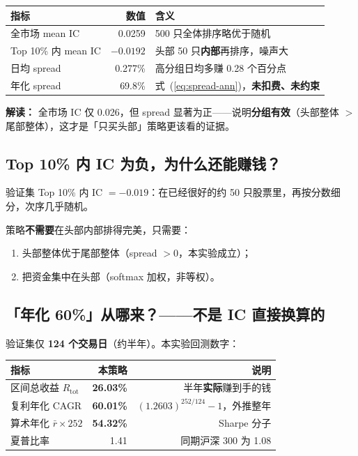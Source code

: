 \documentclass[UTF8,a4paper,12pt]{ctexart}
\begin{document}
\begin{center}
\begin{tabular}{lrl}
\toprule
\textbf{指标} & \textbf{数值} & \textbf{含义} \\
\midrule
全市场 mean IC & 0.0259 & 500 只全体排序略优于随机 \\
Top 10\% 内 mean IC & $-0.0192$ & 头部 50 只\textbf{内部}再排序，噪声大 \\
日均 spread & 0.277\% & 高分组日均多赚 0.28 个百分点 \\
年化 spread & 69.8\% & 式~(\ref{eq:spread-ann})，\textbf{未扣费、未约束} \\
\bottomrule
\end{tabular}
\end{center}

\textbf{解读：} 全市场 IC 仅 0.026，但 spread 显著为正——说明\textbf{分组有效}（头部整体 $>$ 尾部整体），这才是「只买头部」策略更该看的证据。

\subsection{Top 10\% 内 IC 为负，为什么还能赚钱？}

验证集 Top 10\% 内 IC $=-0.019$：在已经很好的约 50 只股票里，再按分数细分，次序几乎随机。

策略\textbf{不需要}在头部内部排得完美，只需要：
\begin{enumerate}[leftmargin=2em]
  \item 头部整体优于尾部整体（spread $>0$，本实验成立）；
  \item 把资金集中在头部（softmax 加权，非等权）。
\end{enumerate}

\subsection{「年化 60\%」从哪来？——不是 IC 直接换算的}

验证集仅 \textbf{124 个交易日}（约半年）。本实验回测数字：

\begin{center}
\begin{tabular}{lrr}
\toprule
\textbf{指标} & \textbf{本策略} & \textbf{说明} \\
\midrule
区间总收益 $R_{\mathrm{tot}}$ & \textbf{26.03\%} & 半年\textbf{实际}赚到手的钱 \\
复利年化 CAGR & \textbf{60.01\%} & $(1.2603)^{252/124}-1$，外推整年 \\
算术年化 $\bar{r}\times 252$ & \textbf{54.32\%} & Sharpe 分子 \\
夏普比率 & 1.41 & 同期沪深 300 为 1.08 \\
\bottomrule
\end{tabular}
\end{center}
\end{document}

